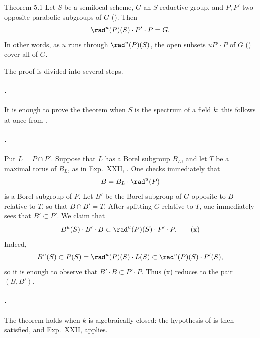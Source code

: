 
\begin{sgastatement}{Theorem 5.1}
Let \(S\) be a semilocal scheme, \(G\) an \(S\)-reductive group, and
\(P,P'\) two opposite parabolic subgroups of \(G\) \textup{()}.
Then
\[
 \rad^u(P)(S)\cdot P'\cdot P=G.
\]
In other words, as \(u\) runs through \(\rad^u(P)(S)\), the open
subsets \(uP'\cdot P\) of \(G\) \textup{()} cover all of \(G\).
\end{sgastatement}

The proof is divided into several steps.

\paragraph{.}
It is enough to prove the theorem when \(S\) is the spectrum of a
field \(k\); this follows at once from .

\paragraph{.}
Put \(L=P\cap P'\).  Suppose that \(L\) has a Borel subgroup \(B_L\),
and let \(T\) be a maximal torus of \(B_L\), as in Exp.\ XXII, .
One checks immediately that
\[
 B=B_L\cdot\rad^u(P)
\]
is a Borel subgroup of \(P\).  Let \(B'\) be the Borel subgroup of
\(G\) opposite to \(B\) relative to \(T\), so that \(B\cap B'=T\).
After splitting \(G\) relative to \(T\), one immediately sees that
\(B'\subset P'\).  We claim that
\[
 B^u(S)\cdot B'\cdot B
 \subset \rad^u(P)(S)\cdot P'\cdot P.                 \tag{x}\label{sga3:xxvi:theorem:5-1:equation:x}
\]
Indeed,
\[
 B^u(S)\subset P(S)
 =\rad^u(P)(S)\cdot L(S)
 \subset\rad^u(P)(S)\cdot P'(S),
\]
so it is enough to observe that \(B'\cdot B\subset P'\cdot P\).
Thus \textup{(x)} reduces  to the pair \((B,B')\).

\paragraph{.}
The theorem holds when \(k\) is algebraically closed: the hypothesis
of  is then satisfied, and Exp.\ XXII,  applies.

